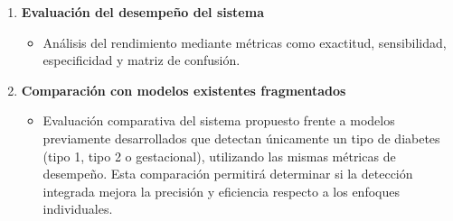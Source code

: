 \begin{itemize}
\begin{enumerate}
        \item \textbf{Evaluaci\'on del desempe\~no del sistema}
        \begin{itemize}
            \item An\'alisis del rendimiento mediante m\'etricas como exactitud, sensibilidad, especificidad y matriz de confusi\'on.
        \end{itemize}
        
        \item \textbf{Comparaci\'on con modelos existentes fragmentados}
        \begin{itemize}
            \item Evaluaci\'on comparativa del sistema propuesto frente a modelos previamente desarrollados que detectan \'unicamente un tipo de diabetes (tipo 1, tipo 2 o gestacional), utilizando las mismas m\'etricas de desempe\~no. Esta comparaci\'on permitir\'a determinar si la detecci\'on integrada mejora la precisi\'on y eficiencia respecto a los enfoques individuales.
        \end{itemize}
        
    \end{enumerate}
\end{itemize}
\renewcommand{\arraystretch}{1.3}